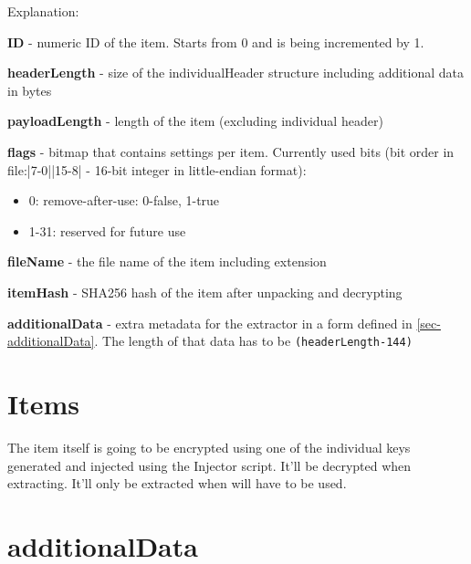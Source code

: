 Explanation:

\textbf{ID} - numeric ID of the item. Starts from 0 and is being incremented by 1.

\textbf{headerLength} - size of the individualHeader structure including additional data in bytes

\textbf{payloadLength} - length of the item (excluding individual header)

\textbf{flags} - bitmap that contains settings per item. Currently used bits (bit order in file:|7-0||15-8| - 16-bit integer in little-endian format):
\begin{itemize}
  \item 0: remove-after-use: 0-false, 1-true
  \item 1-31: reserved for future use
\end{itemize}

\textbf{fileName} - the file name of the item including extension 

\textbf{itemHash} - SHA256 hash of the item after unpacking and decrypting

\textbf{additionalData} - extra metadata for the extractor in a form defined in \autoref{sec-additionalData}. The length of that data has to be \texttt{(headerLength-144)} 

\section{Items}
The item itself is going to be encrypted using one of the individual keys generated and injected using the Injector script. It'll be decrypted when extracting. It'll only be extracted when will have to be used.

\section{additionalData}
\label{sec-additionalData}